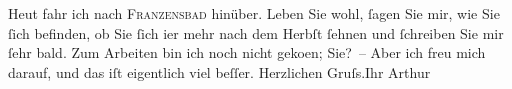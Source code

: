 \begin{ledgroupsized}[t]{13cm}
           \pstart
           Heut fahr ich nach \textsc{Franzensbad} hinüber.\pend
           \pstart
           Leben Sie wohl, ſagen Sie mir, wie Sie ſich befinden, ob Sie ſich i{\geminationm}er mehr nach dem Herbſt ſehnen und ſchreiben Sie
                    mir ſehr bald. Zum Arbeiten bin ich noch {\pb}nicht
                        geko{\geminationm}en; Sie? – Aber ich freu mich darauf, und
                    das iſt eigentlich viel beſſer.\pend
           \pstart Herzlichen Gruſs.\hspace*{2em}Ihr
                        \spacefill\mbox{Arthur}\pend{}\endnumbering{}\end{ledgroupsized}  \newcommand{\dateiname}{L00462}\newcommand{\titel}{Arthur Schnitzler an Hugo von Hofmannsthal, 10. 7. 1895}\newcommand{\editorInnen}{Martin Anton Müller und Gerd-Hermann Susen}
            \footnotesize
\begin{ledgroupsized}[t]{11.5cm}
\end{ledgroupsized}
         
      